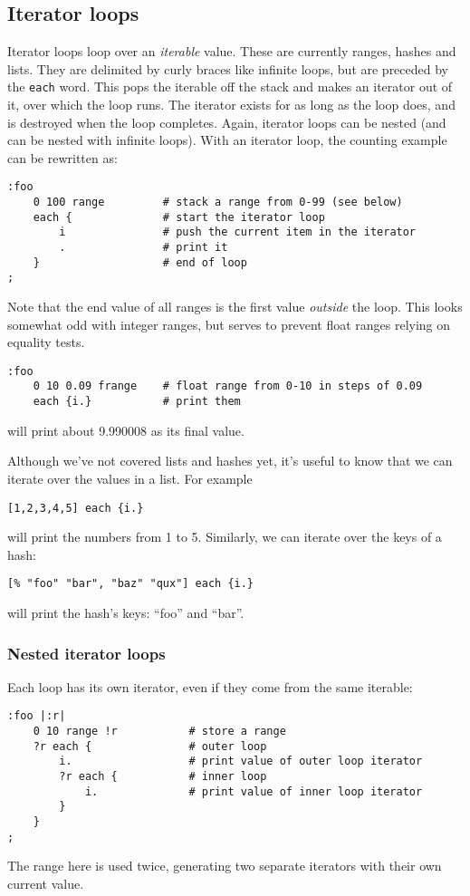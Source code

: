 \subsection{Iterator loops}
Iterator loops loop over an \emph{iterable} value. These are currently ranges,
hashes and lists. They are delimited by curly braces like infinite loops,
but are preceded by the 
\texttt{each} word. This pops the iterable off the stack and makes an
iterator out of it, over which the loop runs. The iterator exists for as 
long as the loop does, and is destroyed when the loop completes. Again, iterator
loops can be nested (and can be nested with infinite loops). With an iterator
loop, the counting example can be rewritten as:
\begin{lstlisting}
:foo
    0 100 range         # stack a range from 0-99 (see below)
    each {              # start the iterator loop
        i               # push the current item in the iterator
        .               # print it
    }                   # end of loop
;
\end{lstlisting}
Note that the end value of all ranges is the first value \emph{outside} the loop.
This looks somewhat odd with integer ranges, but serves to prevent float ranges
relying on equality tests.
\begin{lstlisting}
:foo
    0 10 0.09 frange    # float range from 0-10 in steps of 0.09
    each {i.}           # print them
\end{lstlisting}
will print about 9.990008 as its final value.

Although we've not covered lists and hashes yet, it's useful to know that we can
iterate over the values in a list. For example
\begin{lstlisting}
[1,2,3,4,5] each {i.}
\end{lstlisting}
will print the numbers from 1 to 5. Similarly, we can iterate over the keys of a hash:
\begin{lstlisting}
[% "foo" "bar", "baz" "qux"] each {i.}
\end{lstlisting}
will print the hash's keys: ``foo'' and ``bar''.

\subsubsection{Nested iterator loops}
Each loop has its own iterator, even if they come from the same iterable:
\begin{lstlisting}
:foo |:r|
    0 10 range !r           # store a range
    ?r each {               # outer loop
        i.                  # print value of outer loop iterator
        ?r each {           # inner loop
            i.              # print value of inner loop iterator
        }
    }
;
\end{lstlisting}
The range here is used twice, generating two separate iterators with
their own current value.

